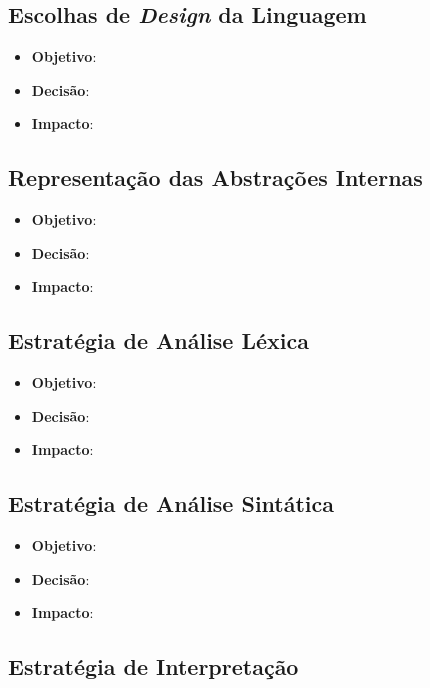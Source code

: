 \subsection{Escolhas de \textit{Design} da Linguagem}

\begin{itemize}
	\item \textbf{Objetivo}:
	\item \textbf{Decisão}:
	\item \textbf{Impacto}:
\end{itemize}

\subsection{Representação das Abstrações Internas}

\begin{itemize}
	\item \textbf{Objetivo}:
	\item \textbf{Decisão}:
	\item \textbf{Impacto}:
\end{itemize}

\subsection{Estratégia de Análise Léxica}

\begin{itemize}
	\item \textbf{Objetivo}:
	\item \textbf{Decisão}:
	\item \textbf{Impacto}:
\end{itemize}

\subsection{Estratégia de Análise Sintática}

\begin{itemize}
	\item \textbf{Objetivo}:
	\item \textbf{Decisão}:
	\item \textbf{Impacto}:
\end{itemize}

\subsection{Estratégia de Interpretação}

